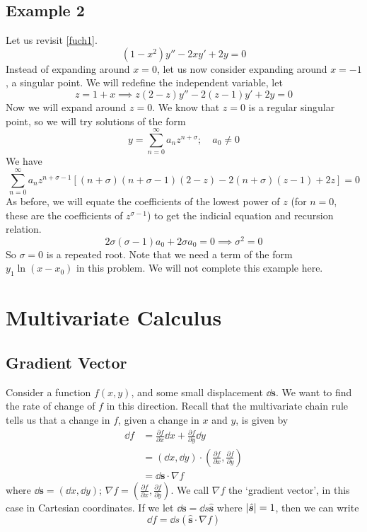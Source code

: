 \documentclass{article}
\begin{document}
\subsection{Example 2}
Let us revisit \eqref{fuch1}.
\[ (1-x^2)y'' - 2xy' + 2y = 0 \]
Instead of expanding around $x=0$, let us now consider expanding around $x=-1$, a singular point. We will redefine the independent variable, let
\[ z = 1 + x \implies z(2-z)y'' - 2(z-1)y' + 2y = 0 \]
Now we will expand around $z=0$. We know that $z=0$ is a regular singular point, so we will try solutions of the form
\[ y = \sum_{n=0}^\infty a_nz^{n+\sigma};\quad a_0 \neq 0 \]
We have
\[ \sum_{n=0}^\infty a_nz^{n+\sigma-1}\left[ (n+\sigma)(n+\sigma-1)(2-z) - 2(n+\sigma)(z-1) + 2z \right] = 0 \]
As before, we will equate the coefficients of the lowest power of $z$ (for $n=0$, these are the coefficients of $z^{\sigma - 1}$) to get the indicial equation and recursion relation.
\[ 2\sigma(\sigma - 1)a_0 + 2\sigma a_0 = 0 \implies \sigma^2 = 0 \]
So $\sigma = 0$ is a repeated root. Note that we need a term of the form $y_1\ln (x-x_0)$ in this problem. We will not complete this example here.

\section{Multivariate Calculus}
\subsection{Gradient Vector}
Consider a function $f(x, y)$, and some small displacement $\dd \bm s$. We want to find the rate of change of $f$ in this direction. Recall that the multivariate chain rule tells us that a change in $f$, given a change in $x$ and $y$, is given by
\begin{align*}
	\dd f & = \frac{\partial f}{\partial x} \dd x + \frac{\partial f}{\partial y}\dd y                         \\
	      & = (\dd x, \dd y) \cdot \left( \frac{\partial f}{\partial x}, \frac{\partial f}{\partial y} \right) \\
	      & = \dd \bm s \cdot \nabla f
\end{align*}
where $\dd \bm s = (\dd x, \dd y)$; $\nabla f = \left( \frac{\partial f}{\partial x}, \frac{\partial f}{\partial y} \right)$. We call $\nabla f$ the `gradient vector', in this case in Cartesian coordinates. If we let $\dd \bm s = \dd s \hat{\bm s}$ where $\abs{\hat{\bm s}} = 1$, then we can write
\[ \dd f = \dd s (\hat{\bm s}\cdot \nabla f) \]
\end{document}
